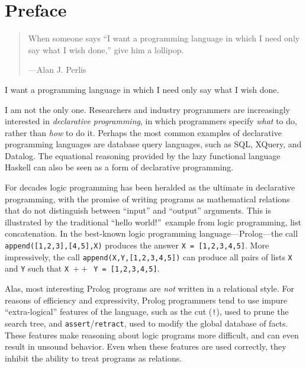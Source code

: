 \chapter{Preface}\label{sec:preface}

\vspace{-1cm}
\begin{quote}When someone says ``I want a programming language in which I need only say what I wish done,'' give him a lollipop.
\vspace{-3mm}
\begin{flushright}
---Alan J. Perlis
\end{flushright}
\end{quote}

\noindent
I want a programming language in which I need only say what I wish
done.

I am not the only one.   Researchers and industry programmers are
increasingly interested in \emph{declarative programming}, in which
programmers specify \emph{what} to do, rather than \emph{how} to do
it.  Perhaps the most common examples of declarative programming
languages are database query languages, such as SQL, XQuery, and
Datalog.  The equational reasoning provided by the lazy functional
language Haskell can also be seen as a form of declarative
programming.

For decades logic programming has been heralded as the ultimate in
declarative programming, with the promise of writing programs as
mathematical relations that do not distinguish between ``input'' and
``output'' arguments.  This is illustrated by the traditional ``hello
world!''~example from logic programming, list concatenation.  In the
best-known logic programming language---Prolog---the call \mbox{{\tt append([1,2,3],[4,5],X)}}
produces the answer \mbox{{\tt X = [1,2,3,4,5]}}.
More impressively, the call 
\mbox{{\tt append(X,Y,[1,2,3,4,5])}} can produce all pairs of lists
{\tt X} and {\tt Y} such that \mbox{{\tt X} $++$ {\tt Y = [1,2,3,4,5]}}.

Alas, most interesting Prolog programs are \emph{not} written in a
relational style.  For reasons of efficiency and expressivity, Prolog
programmers tend to use impure ``extra-logical'' features of the
language, such as the cut ({\tt !}), used to prune the search tree,
and {\tt assert}/{\tt retract}, used to modify the global database of
facts.  These features make reasoning about logic programs more
difficult, and can even result in unsound behavior.  Even when these
features are used correctly, they inhibit the ability to treat programs
as relations.

